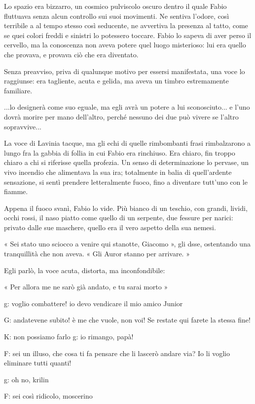 Lo spazio era bizzarro, un cosmico pulviscolo oscuro dentro il quale Fabio fluttuava senza alcun controllo sui suoi movimenti. Ne sentiva l'odore, così terribile a al tempo stesso così seducente, ne avvertiva la presenza al tatto, come se quei colori freddi e sinistri lo potessero toccare. Fabio lo sapeva di aver perso il cervello, ma la conoscenza non aveva potere quel luogo misterioso: lui era quello che provava, e provava ciò che era diventato.

Senza preavviso, priva di qualunque motivo per essersi manifestata, una voce lo raggiunse: era tagliente, acuta e gelida, ma aveva un timbro estremamente familiare.

...lo designerà come suo eguale, ma egli avrà un potere a lui sconosciuto...
e l'uno dovrà morire per mano dell'altro, perché nessuno dei due può vivere se l'altro sopravvive...

La voce di Lavinia tacque, ma gli echi di quelle rimbombanti frasi rimbalzarono a lungo fra la gabbia di follia in cui Fabio era rinchiuso. Era chiaro, fin troppo chiaro a chi si riferisse quella profezia. Un senso di determinazione lo pervase, un vivo incendio che alimentava la sua ira; totalmente in balia di quell'ardente sensazione, si sentì prendere letteralmente fuoco, fino a diventare tutt'uno con le fiamme.

Appena il fuoco svanì, Fabio lo vide. Più bianco di un teschio, con grandi, lividi, occhi rossi, il naso piatto come quello di un serpente, due fessure per narici: privato dalle sue maschere, quello era il vero aspetto della sua nemesi. 

« Sei stato uno sciocco a venire qui stanotte, Giacomo », gli dsse, ostentando una tranquillità che non aveva. « Gli Auror stanno per arrivare. »

Egli parlò, la voce acuta, distorta, ma inconfondibile:

« Per allora me ne sarò già andato, e tu sarai morto »



g: voglio combattere! io devo vendicare il mio amico Junior

G: andatevene subito! è me che vuole, non voi! Se restate qui farete la stessa fine!

K: non possiamo farlo
g: io rimango, papà!

F: sei un illuso, che cosa ti fa pensare che li lascerò andare via? Io li voglio eliminare tutti quanti!

g: oh no, krilin

F: sei così ridicolo, moscerino

